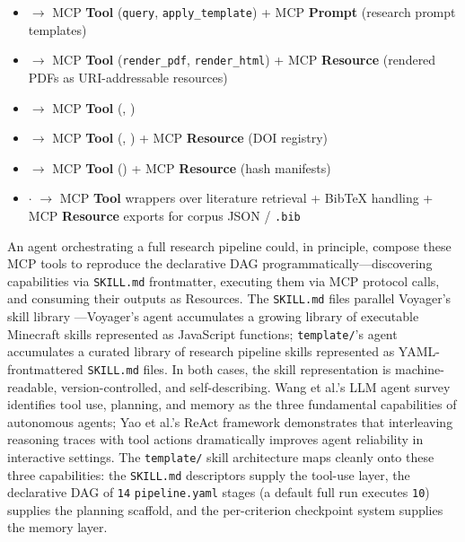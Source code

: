 \documentclass[
]{article}
\providecommand{\tightlist}{%
  \setlength{\itemsep}{0pt}\setlength{\parskip}{0pt}}
\begin{document}
\begin{itemize}
\tightlist
\item
   \texorpdfstring{\ensuremath{\to}}{->} MCP \textbf{Tool} (\texttt{query},
  \texttt{apply\_template}) + MCP \textbf{Prompt} (research prompt
  templates)
\item
   \texorpdfstring{\ensuremath{\to}}{->} MCP \textbf{Tool}
  (\texttt{render\_pdf}, \texttt{render\_html}) + MCP \textbf{Resource}
  (rendered PDFs as URI-addressable resources)
\item
   \texorpdfstring{\ensuremath{\to}}{->} MCP \textbf{Tool}
  (, )
\item
   \texorpdfstring{\ensuremath{\to}}{->} MCP \textbf{Tool}
  (, ) +
  MCP \textbf{Resource} (DOI registry)
\item
   \texorpdfstring{\ensuremath{\to}}{->} MCP \textbf{Tool}
  () + MCP \textbf{Resource}
  (hash manifests)
\item
   \texorpdfstring{\ensuremath{\cdot}}{.}  \texorpdfstring{\ensuremath{\to}}{->}
  MCP \textbf{Tool} wrappers over literature retrieval + BibTeX handling
  + MCP \textbf{Resource} exports for corpus JSON / \texttt{.bib}
\end{itemize}

An agent orchestrating a full research pipeline could, in principle,
compose these MCP tools to reproduce the declarative DAG
programmatically---discovering capabilities via \texttt{SKILL.md}
frontmatter, executing them via MCP protocol calls, and consuming their
outputs as Resources. The \texttt{SKILL.md} files parallel Voyager's
skill library \citep{wang2023voyager}---Voyager's agent accumulates a
growing library of executable Minecraft skills represented as JavaScript
functions; \texttt{template/}'s agent accumulates a curated library of
research pipeline skills represented as YAML-frontmattered
\texttt{SKILL.md} files. In both cases, the skill representation is
machine-readable, version-controlled, and self-describing. Wang et al.'s
LLM agent survey \citep{wang2024llmagents} identifies tool use,
planning, and memory as the three fundamental capabilities of autonomous
agents; Yao et al.'s ReAct framework \citep{yao2023react} demonstrates
that interleaving reasoning traces with tool actions dramatically
improves agent reliability in interactive settings. The
\texttt{template/} skill architecture maps cleanly onto these three
capabilities: the \texttt{SKILL.md} descriptors supply the tool-use
layer, the declarative DAG of \texttt{14} \texttt{pipeline.yaml} stages
(a default full run executes \texttt{10}) supplies the planning
scaffold, and the per-criterion checkpoint system supplies the memory
layer.
\end{document}
